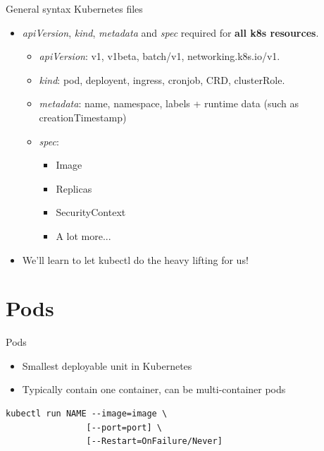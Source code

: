 \documentclass{beamer}
\begin{document}
\begin{frame}{General syntax Kubernetes files}

\begin{itemize}
    \item \textit{apiVersion}, \textit{kind}, \textit{metadata} and \textit{spec} required for \textbf{all k8s resources}.
    \begin{itemize}
        \item \textit{apiVersion}: v1, v1beta, batch/v1, networking.k8s.io/v1.
        \item \textit{kind}: pod, deployent, ingress, cronjob, CRD, clusterRole.
        \item \textit{metadata}: name, namespace, labels \newline
                 + runtime data (such as creationTimestamp) 
        \item \textit{spec}:
        \begin{itemize}
            \item Image
            \item Replicas
            \item SecurityContext
            \item A lot more...
        \end{itemize}
    \end{itemize}
    \item We'll learn to let kubectl do the heavy lifting for us! 
\end{itemize}

\end{frame}

\section{Pods}

\begin{frame}[fragile]{Pods}

\begin{itemize}
    \item Smallest deployable unit in Kubernetes
    \item Typically contain one container, can be multi-container pods
\end{itemize}
\pause
\begin{lstlisting}
kubectl run NAME --image=image \
                [--port=port] \
                [--Restart=OnFailure/Never]
\end{lstlisting}
\end{frame}
\end{document}
